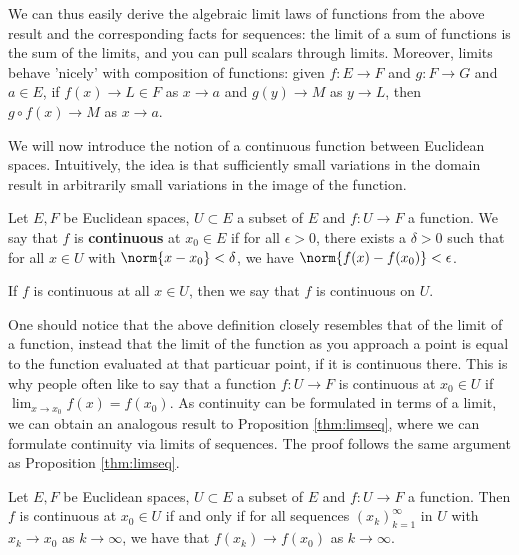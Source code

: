  We can thus easily derive the algebraic limit laws of functions from the above result and the corresponding facts for sequences: the limit of a sum of functions is the sum of the limits, and you can pull scalars through limits. Moreover, limits behave 'nicely' with composition of functions: given \( f:E\to F \) and \( g:F\to G \) and \( a\in E \), if \( f(x)\to L\in F \) as \( x\to a \) and \( g(y)\to M \) as \( y\to L \), then \( g\circ f(x)\to M \) as \( x\to a \).

 \vspace{3mm}

 We will now introduce the notion of a continuous function between Euclidean spaces. Intuitively, the idea is that sufficiently small variations in the domain result in arbitrarily small variations in the image of the function.

 \begin{definition}
   Let \( E, F \) be Euclidean spaces, \( U\subset E \) a subset of \( E \) and \( f:U\to F \) a function. We say that \( f \) is \textbf{continuous} at \( x_0\in E \) if for all \( \epsilon>0 \), there exists a \( \delta>0 \) such that for all \( x\in U \) with \( \norm{x-x_0}<\delta \), we have \( \norm{f(x)-f(x_0)}<\epsilon \).

   \vspace{3mm}

   If \( f \) is continuous at all \( x\in U \), then we say that \( f \) is continuous on \( U \).
 \end{definition}

 One should notice that the above definition closely resembles that of the limit of a function, instead that the limit of the function as you approach a point is equal to the function evaluated at that particuar point, if it is continuous there. This is why people often like to say that a function \( f:U\to F \) is continuous at \( x_0\in U \) if \( \lim_{x\to x_0}f(x)=f(x_0) \). As continuity can be formulated in terms of a limit, we can obtain an analogous result to Proposition \ref{thm:limseq}, where we can formulate continuity via limits of sequences. The proof follows the same argument as Proposition \ref{thm:limseq}.

 \begin{proposition}
   \label{thm:seqcont}
   Let \( E, F \) be Euclidean spaces, \( U\subset E \) a subset of \( E \) and \( f:U\to F \) a function. Then \( f \) is continuous at \( x_0\in U \) if and only if for all sequences \( (x_k)_{k=1}^\infty \) in \( U \) with \( x_k\to x_0 \) as \( k\to\infty \), we have that \( f(x_k)\to f(x_0) \) as \( k\to\infty \).
 \end{proposition}

